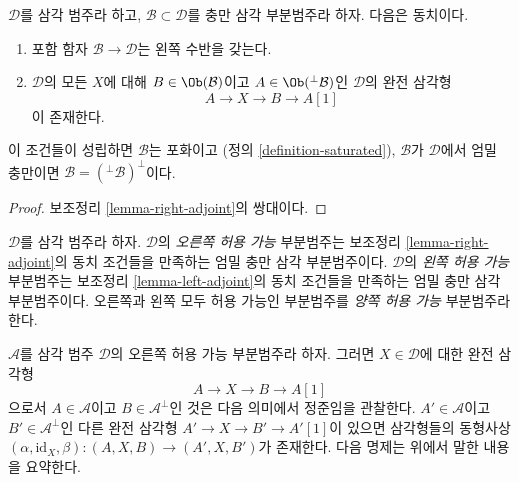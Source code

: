 \begin{lemma}
\label{lemma-left-adjoint}
$\mathcal{D}$를 삼각 범주라 하고,
$\mathcal{B} \subset \mathcal{D}$를 충만 삼각 부분범주라 하자.
다음은 동치이다.
\begin{enumerate}
\item 포함 함자 $\mathcal{B} \to \mathcal{D}$는 왼쪽 수반을 갖는다.
\item $\mathcal{D}$의 모든 $X$에 대해 $B \in \Ob(\mathcal{B})$이고
$A \in \Ob({}^\perp\mathcal{B})$인 $\mathcal{D}$의 완전 삼각형
$$
A \to X \to B \to A[1]
$$
이 존재한다.
\end{enumerate}
이 조건들이 성립하면 $\mathcal{B}$는 포화이고
(정의 \ref{definition-saturated}), $\mathcal{B}$가 $\mathcal{D}$에서
엄밀 충만이면 $\mathcal{B} = ({}^\perp\mathcal{B})^\perp$이다.
\end{lemma}

\begin{proof}
보조정리 \ref{lemma-right-adjoint}의 쌍대이다.
\end{proof}

\begin{definition}
\label{definition-admissible}
$\mathcal{D}$를 삼각 범주라 하자. $\mathcal{D}$의
{\it 오른쪽 허용 가능} 부분범주는 보조정리
\ref{lemma-right-adjoint}의 동치 조건들을 만족하는 엄밀 충만 삼각
부분범주이다. $\mathcal{D}$의 {\it 왼쪽 허용 가능} 부분범주는
보조정리 \ref{lemma-left-adjoint}의 동치 조건들을 만족하는 엄밀 충만
삼각 부분범주이다. 오른쪽과 왼쪽 모두 허용 가능인 부분범주를
{\it 양쪽 허용 가능} 부분범주라 한다.
\end{definition}

\noindent
$\mathcal{A}$를 삼각 범주 $\mathcal{D}$의 오른쪽 허용 가능
부분범주라 하자. 그러면 $X \in \mathcal{D}$에 대한 완전 삼각형
$$
A \to X \to B \to A[1]
$$
으로서 $A \in \mathcal{A}$이고 $B \in \mathcal{A}^\perp$인 것은
다음 의미에서 정준임을 관찰한다. $A' \in \mathcal{A}$이고
$B' \in \mathcal{A}^\perp$인 다른 완전 삼각형
$A' \to X \to B' \to A'[1]$이 있으면 삼각형들의 동형사상
$(\alpha, \text{id}_X, \beta) : (A, X, B) \to (A', X, B')$가 존재한다.
다음 명제는 위에서 말한 내용을 요약한다.

